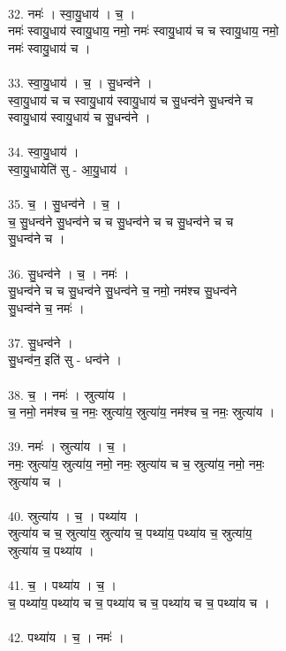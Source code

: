 \\
32. नमः॑ । स्वा॒यु॒धाय॑ । च॒ ।\\
नमः॑ स्वायु॒धाय॑ स्वायु॒धाय॒ नमो॒ नमः॑ स्वायु॒धाय॑ च च स्वायु॒धाय॒ नमो॒\\
नमः॑ स्वायु॒धाय॑ च ।\\
\\
33. स्वा॒यु॒धाय॑ । च॒ । सु॒धन्व॑ने ।\\
स्वा॒यु॒धाय॑ च च स्वायु॒धाय॑ स्वायु॒धाय॑ च सु॒धन्व॑ने सु॒धन्व॑ने च\\
स्वायु॒धाय॑ स्वायु॒धाय॑ च सु॒धन्व॑ने ।\\
\\
34. स्वा॒यु॒धाय॑ ।\\
स्वा॒यु॒धायेति॑ सु - आ॒यु॒धाय॑ ।\\
\\
35. च॒ । सु॒धन्व॑ने । च॒ ।\\
च॒ सु॒धन्व॑ने सु॒धन्व॑ने च च सु॒धन्व॑ने च च सु॒धन्व॑ने च च\\
सु॒धन्व॑ने च ।\\
\\
36. सु॒धन्व॑ने । च॒ । नमः॑ ।\\
सु॒धन्व॑ने च च सु॒धन्व॑ने सु॒धन्व॑ने च॒ नमो॒ नम॑श्च सु॒धन्व॑ने\\
सु॒धन्व॑ने च॒ नमः॑ ।\\
\\
37. सु॒धन्व॑ने ।\\
सु॒धन्व॑न॒ इति॑ सु - धन्व॑ने ।\\
\\
38. च॒ । नमः॑ । स्रुत्या॑य ।\\
च॒ नमो॒ नम॑श्च च॒ नमः॒ स्रुत्या॑य॒ स्रुत्या॑य॒ नम॑श्च च॒ नमः॒ स्रुत्या॑य ।\\
\\
39. नमः॑ । स्रुत्या॑य । च॒ ।\\
नमः॒ स्रुत्या॑य॒ स्रुत्या॑य॒ नमो॒ नमः॒ स्रुत्या॑य च च॒ स्रुत्या॑य॒ नमो॒ नमः॒\\
स्रुत्या॑य च ।\\
\\
40. स्रुत्या॑य । च॒ । पथ्या॑य ।\\
स्रुत्या॑य च च॒ स्रुत्या॑य॒ स्रुत्या॑य च॒ पथ्या॑य॒ पथ्या॑य च॒ स्रुत्या॑य॒\\
स्रुत्या॑य च॒ पथ्या॑य ।\\
\\
41. च॒ । पथ्या॑य । च॒ ।\\
च॒ पथ्या॑य॒ पथ्या॑य च च॒ पथ्या॑य च च॒ पथ्या॑य च च॒ पथ्या॑य च ।\\
\\
42. पथ्या॑य । च॒ । नमः॑ ।\\
